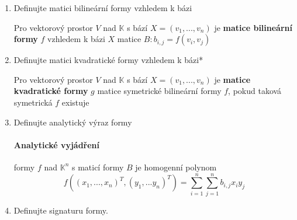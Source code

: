 \documentclass[10pt,a4paper]{article}
\theoremstyle{plain}
\theoremstyle{definition}
\begin{document}
\begin{enumerate}
\item Definujte matici bilineární formy vzhledem k bázi

Pro vektorový prostor $V$ nad $\mathbb{K}$ s bází $X = (v_1, ..., v_n)$ je \textbf{matice bilineární formy} $f$ vzhledem k bázi $X$ matice $B: b_{i,j} = f(v_i, v_j)$

\item Definujte matici kvadratické formy vzhledem k bázi*

Pro vektorový prostor $V$ nad $\mathbb{K}$ s bází $X = (v_1, ..., v_n)$ je \textbf{matice kvadratické formy} $g$ matice symetrické bilineární formy $f$, pokud taková symetrická $f$ existuje

\item Definujte analytický výraz formy

\paragraph{Analytické vyjádření} formy $f$ nad $\mathbb{K}^n$ s maticí formy $B$ je homogenní polynom
\[ f((x_1,...,x_n)^T,(y_1,...y_n)^T)= \sum^n_{i=1}\sum^n_{j=1}b_{i,j}x_iy_j\]

\item Definujte signaturu formy.


\end{enumerate}

\newpage
\end{document}
